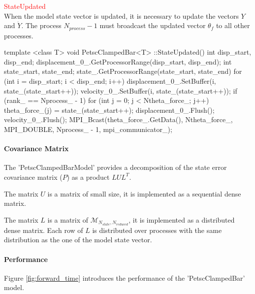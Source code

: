 \par \textcolor{red}{StateUpdated}\\


When the model state vector is updated, it is necessary to update the vectors $Y$ and $\dot Y$. The process $N_{process} - 1$ must broadcast the updated vector $\theta_f$ to all other processes.

\begin{frame_cpp}
template <class T>
void PetscClampedBar<T>
::StateUpdated()
{
    int disp_start, disp_end;
    displacement_0_.GetProcessorRange(disp_start, disp_end);
    int state_start, state_end;
    state_.GetProcessorRange(state_start, state_end)
    for (int i = disp_start; i < disp_end; i++)
    {
        displacement_0_.SetBuffer(i, state_(state_start++));
        velocity_0_.SetBuffer(i, state_(state_start++));
    }
    if (rank_ == Nprocess_ - 1)
        for (int j = 0; j < Ntheta_force_; j++)
            theta_force_(j) = state_(state_start++);
    displacement_0_.Flush();
    velocity_0_.Flush();
    MPI_Bcast(theta_force_.GetData(), Ntheta_force_, MPI_DOUBLE, Nprocess_ - 1, mpi_communicator_);
}
\end{frame_cpp}



\hypertarget{seq-par-dm-cm}{}\paragraph{Covariance Matrix}\label{seq-par-dm-cm}

The 'PetscClampedBarModel' provides a decomposition of the state error covariance matrix ($P$) as a product $LUL^T$.

The matrix $U$ is a matrix of small size, it is implemented as a sequential dense matrix.

The matrix $L$ is a matrix of $\mathcal{M}_{N_{state}, N_{reduced}}$, it is implemented as a distributed dense matrix. Each row of $L$ is distributed over processes with the same distribution as the one of the model state vector.

\hypertarget{seq-par-dm-p}{}\paragraph{Performance}\label{seq-par-dm-p}


Figure  \ref{fig:forward_time} introduces the performance of the 'PetscClampedBar' model.



